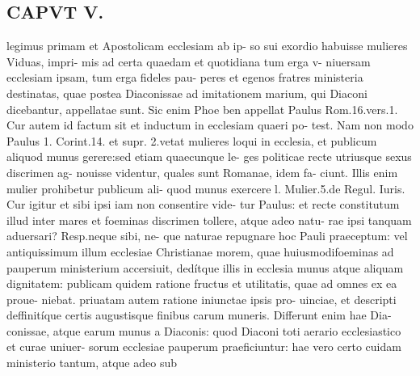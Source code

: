 \documentclass{article}
\begin{document}
\begin{pages}
\section*{CAPVT V. }
\marginpar{[ p.271 ]}legimus primam et Apostolicam ecclesiam ab ip- so sui exordio habuisse mulieres Viduas, impri- mis ad certa quaedam et quotidiana tum erga v- niuersam ecclesiam ipsam, tum erga fideles pau- peres et egenos fratres ministeria destinatas, quae postea Diaconissae ad imitationem marium, qui Diaconi dicebantur, appellatae sunt. Sic enim Phoe ben appellat Paulus Rom.16.vers.1. Cur autem id factum sit et inductum in ecclesiam quaeri po- test. Nam non modo Paulus 1. Corint.14. et supr. 2.vetat mulieres loqui in ecclesia, et publicum aliquod munus gerere:sed etiam quaecunque le- ges politicae recte utriusque sexus discrimen ag- nouisse videntur, quales sunt Romanae, idem fa- ciunt. Illis enim mulier prohibetur publicum ali- quod munus exercere l. Mulier.5.de Regul. Iuris. Cur igitur et sibi ipsi iam non consentire vide- tur Paulus: et recte constitutum illud inter mares et foeminas discrimen tollere, atque adeo natu- rae ipsi tanquam aduersari? Resp.neque sibi, ne- que naturae repugnare hoc Pauli praeceptum: vel antiquissimum illum ecclesiae Christianae morem, quae huiusmodifoeminas ad pauperum ministerium accersiuit, dedítque illis in ecclesia munus atque aliquam dignitatem: publicam quidem ratione fructus et utilitatis, quae ad omnes ex ea proue- niebat. priuatam autem ratione iniunctae ipsis pro- uinciae, et descripti deffinitíque certis augustisque finibus carum muneris. Differunt enim hae Dia- conissae, atque earum munus a Diaconis: quod Diaconi toti aerario ecclesiastico et curae uniuer- sorum ecclesiae pauperum praeficiuntur: hae vero certo cuidam ministerio tantum, atque adeo sub 

\end{pages}
\end{document}
